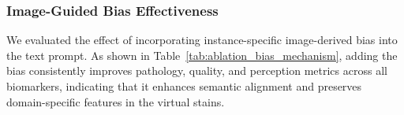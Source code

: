 \documentclass[journal,twoside,web]{ieeecolor}
\newcommand{\revision}[1]{\textcolor{revisioncolor}{#1}}  %
\renewcommand{\revision}[1]{#1}%
\begin{document}
\begin{table}[!htbp]
  \centering
  \setlength\tabcolsep{2pt}
  \renewcommand{\arraystretch}{1.0}
  \caption{\revision{ABLATION STUDY OF GUIDANCE MECHANISM ON MIST DATASET. THE BEST SCORES ARE HIGHLIGHTED IN BOLD.}}
  \label{tab:ablation_CONCH_}

\end{table}

\subsubsection{Image-Guided Bias Effectiveness} {We evaluated the effect of incorporating instance-specific image-derived bias into the text prompt. As shown in Table~\ref{tab:ablation_bias_mechanism}, adding the bias consistently improves pathology, quality, and perception metrics across all biomarkers, indicating that it enhances semantic alignment and preserves domain-specific features in the virtual stains.}
\end{document}
